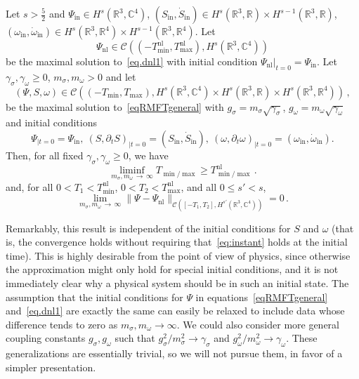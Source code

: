 \documentclass[AHL,Unicode,longabstracts,published]{cedram}
\newcommand{\rmin}{\mathrm{in}}
\newcommand{\nl}{\mathrm{nl}}
\newcommand{\cC}{\mathcal{C}}
\newcommand\R{\mathbb{R}}
\newcommand\C{\mathbb{C}}
\begin{document}
\begin{theo}\label{thm.main1}
Let $s>\tfrac52$ and $\Psi_\rmin\in H^s(\R^3, \C^4)$, $(S_\rmin,\dot{S}_\rmin)\in H^s(\R^3, \R)\times H^{s-1}(\R^3, \R)$, $(\omega_\rmin,\dot{\omega}_\rmin)\in H^s(\R^3, \R^4)\times H^{s-1}(\R^3, \R^4)$. Let
\begin{equation*}
\Psi_\nl\in\cC\left(\left(-T_{\min}^{\nl}, T_{\max}^{\nl}\right),H^s\left(\R^3, \C^4\right)\right)
\end{equation*}
be the maximal solution to~\eqref{eq.dnl1} with initial condition $\Psi_\nl\vert_{t=0}=\Psi_\rmin$. Let $\gamma_\sigma, \gamma_\omega \geq 0$, $m_\sigma, m_\omega>0$ and let
\[
(\Psi,S,\omega)\in \cC\left((-T_{\min}, T_{\max}),H^s\left(\R^3, \C^4\right)\times H^s\left(\R^3,\R\right)\times H^s\left(\R^3, \R^4\right)\right)\,,
\]
be the maximal solution to~\eqref{eqRMFTgeneral} with $g_\sigma=m_\sigma\sqrt{\gamma_\sigma}$, $g_\omega=m_\omega\sqrt{\gamma_\omega}$ and initial conditions
\begin{equation*}
\Psi_{|t=0}=\Psi_\rmin,\ (S,\partial_t S)_{|t=0}= (S_\rmin,\dot{S}_\rmin), \ (\omega,\partial_t \omega)_{|t=0}= (\omega_\rmin,\dot{\omega}_\rmin).
\end{equation*}
Then, for all fixed $\gamma_\sigma, \gamma_\omega \geq 0$, we have
\[
\liminf_{m_\sigma, m_\omega\,\to\,\infty}T_{\min/\max}\geq T_{\min/\max}^{\nl}\,.
\]
and, for all $0<T_1<T_{\min}^{\nl}$, $0<T_2<T_{\max}^{\nl}$, and all $0\leq s'<s$,
\[
\lim_{m_\sigma, m_\omega\,\to\,\infty}\|\Psi-\Psi_{\nl}\|_{\cC\left([-T_1, T_2],H^{s'}\left(\R^3, \C^4\right)\right)}=0\,.
\]
\end{theo}

Remarkably, this result is independent of the initial conditions for $S$ and $\omega$ (that is, the convergence holds without requiring that~\eqref{eq:instant} holds at the initial time). This is highly desirable from the point of view of physics, since otherwise the approximation might only hold for special initial conditions, and it is not immediately clear why a physical system should be in such an initial state. The assumption that the initial conditions for $\Psi$ in equations~\eqref{eqRMFTgeneral} and~\eqref{eq.dnl1} are exactly the same can easily be relaxed to include data whose difference tends to zero as $m_\sigma, m_\omega \to \infty$. We could also consider more general coupling constants $g_\sigma, g_\omega$ such that $g_\sigma^2/m_\sigma^2\to \gamma_\sigma$ and $g_\omega^2/m_\omega^2\to\gamma_\omega$. These generalizations are essentially trivial, so we will not pursue them, in favor of a simpler presentation.
\end{document}
